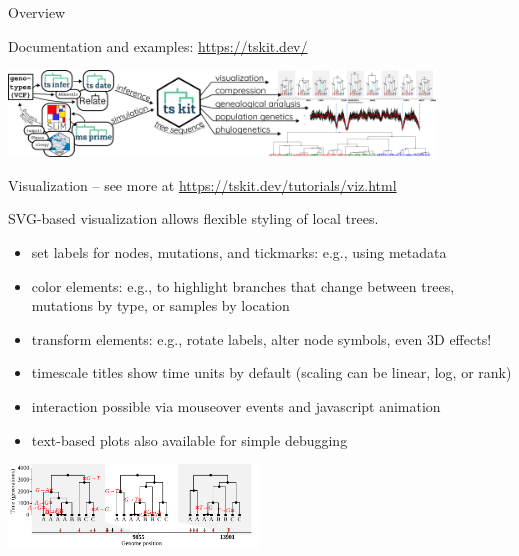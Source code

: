 \documentclass[landscape,a0paper,fontscale=0.4]{baposter}
\newcommand{\compresslist}{%
 \setlength{\itemsep}{1pt}%
 \setlength{\parskip}{0pt}%
 \setlength{\parsep}{0pt}%
 }
\begin{document}
\begin{poster}
\begin{posterbox}[name=overview,column=1,row=0,span=2]{Overview}
\begin{multicols}{2}
\end{multicols}

\begin{center} \Large
    Documentation and examples: \url{https://tskit.dev/}

    \vspace{2em}

    \includegraphics[width=0.85\textwidth]{workflow}
\end{center}


\end{posterbox}

\begin{posterbox}[name=viz,column=1,row=0,span=2,below=overview]{Visualization -- \textup{see more at \url{https://tskit.dev/tutorials/viz.html}}}


\begin{multicols}{2}

SVG-based visualization allows flexible styling of local trees.

\begin{itemize} \compresslist
    \item set labels for nodes, mutations, and tickmarks: e.g., using metadata
    \item color elements: e.g., to highlight branches that change between trees,
        mutations by type, or samples by location
    \item transform elements: e.g., rotate labels, alter node symbols, even 3D effects!
    \item timescale titles show time units by default (scaling can be linear, log, or rank)
    \item interaction possible via mouseover events and javascript animation
    \item text-based plots also available for simple debugging
\end{itemize}

\begin{center}
\includegraphics[width=0.5\textwidth]{viz_23_0}
\end{center}


\end{multicols}
\end{posterbox}
\end{poster}
\end{document}
